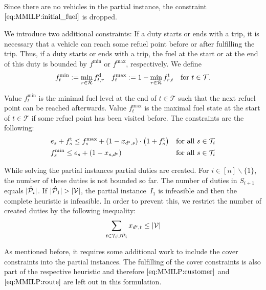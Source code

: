 Since there are no vehicles in the partial instance, the constraint $\eqref{eq:MMILP:initial_fuel}$ is dropped.

We introduce two additional constraints: If a duty starts or ends with a trip, it is necessary that a vehicle can reach some refuel point before or after fulfilling the trip. Thus, if a duty starts or ends with a trip, the fuel at the start or at the end of this duty is bounded by $f^{\min}$ or $f^{\max}$, respectively. We define
\begin{align*}
	f^{\min}_t := \min_{r\in\mathcal{R}}f^{\operatorname{d}}_{t,r} && f^{\max}_t := 1 - \min_{r\in\mathcal{R}}f^{\operatorname{t}}_{r,t} && \text{for } t\in\mathcal{T}.
\end{align*}

Value $f^{\min}_t$ is the minimal fuel level at the end of ${t\in\mathcal{T}}$ such that the next refuel point can be reached afterwards. Value $f^{\max}_t$ is the maximal fuel state at the start of ${t\in\mathcal{T}}$ if some refuel point has been visited before. The constraints are the following:
\begin{align}
	& e_s + f^{\operatorname{t}}_s \leq f^{\max}_s + \left(1-x_{d^{\operatorname{s}},s}\right)\cdot\left(1+f^{\operatorname{t}}_s\right) && \text{for all } s\in\mathcal{T}_i \label{eq:CMILP:fmax} \\
	& f^{\min}_s \leq e_s + \left(1-x_{s,d^{\operatorname{e}}}\right) && \text{for all } s\in\mathcal{T}_i \label{eq:CMILP:fmin}
\end{align}

While solving the partial instances partial duties are created. For ${i\in[n]\backslash\{1\}}$, the number of these duties is not bounded so far. The number of duties in $S_{i+1}$ equals $\vert\hat{\mathcal{P}}_i\vert$. If ${\vert\hat{\mathcal{P}}_1\vert > \vert\mathcal{V}\vert}$, the partial instance~$I_1$ is infeasible and then the complete heuristic is infeasible. In order to prevent this, we restrict the number of created duties by the following inequality:
\begin{align}
	\sum_{t\in\mathcal{T}_i\cup\hat{\mathcal{P}}_i} x_{d^{\operatorname{s}},t} \leq \vert\mathcal{V}\vert \label{eq:CMILP:strengthening}
\end{align}

As mentioned before, it requires some additional work to include the cover constraints into the partial instances. The fulfilling of the cover constraints is also part of the respective heuristic and therefore $\eqref{eq:MMILP:customer}$ and $\eqref{eq:MMILP:route}$ are left out in this formulation.

